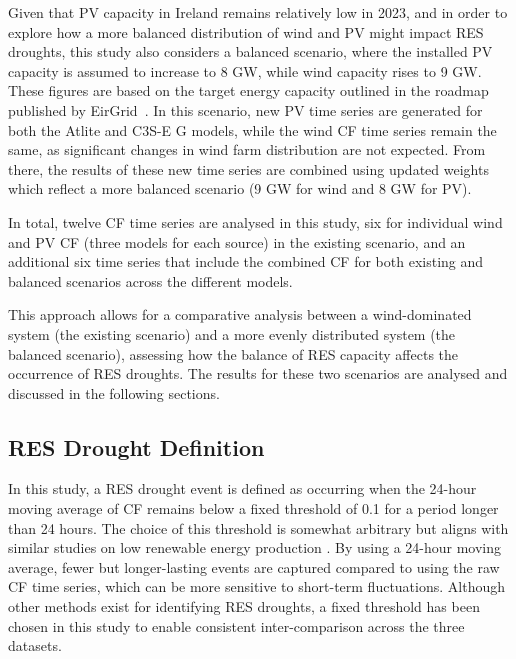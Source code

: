 \documentclass[a4paper, 11pt]{article}
\begin{document}
Given that PV capacity in Ireland remains relatively low in 2023, and in order to explore how a more balanced distribution of wind and PV might impact RES droughts, this study also considers a balanced scenario, where the installed PV capacity is assumed to increase to 8 GW, while wind capacity rises to 9 GW. These figures are based on the target energy capacity outlined in the roadmap published by EirGrid~\cite{eirgrid2023future}. In this scenario, new PV time series are generated for both the Atlite and C3S-E G models, while the wind CF time series remain the same, as significant changes in wind farm distribution are not expected. From there, the results of these new time series are combined using updated weights which reflect a more balanced scenario (9 GW for wind and 8 GW for PV).

In total, twelve CF time series are analysed in this study, six for individual wind and PV CF (three models for each source) in the existing scenario, and an additional six time series that include the combined CF for both existing and balanced scenarios across the different models.

This approach allows for a comparative analysis between a wind-dominated system (the existing scenario) and a more evenly distributed system (the balanced scenario), assessing how the balance of RES capacity affects the occurrence of RES droughts. The results for these two scenarios are analysed and discussed in the following sections.

\subsection{RES Drought Definition}
\label{sec:res_drought}

In this study, a RES drought event is defined as occurring when the 24-hour moving average of CF remains below a fixed threshold of 0.1 for a period longer than 24 hours. The choice of this threshold is somewhat arbitrary but aligns with similar studies on low renewable energy production \cite{kaspar2019drought, ohba2022drought, mayer2023drought} . By using a 24-hour moving average, fewer but longer-lasting events are captured compared to using the raw CF time series, which can be more sensitive to short-term fluctuations. Although other methods exist for identifying RES droughts, a fixed threshold has been chosen in this study to enable consistent inter-comparison across the three datasets.
\end{document}
